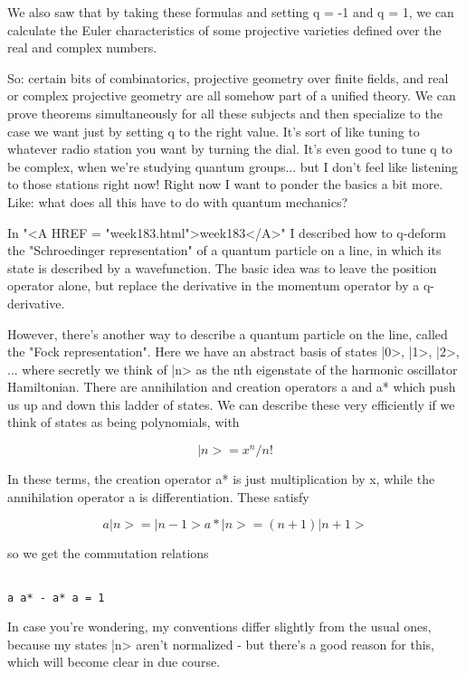 We also saw that by taking these formulas and setting q = -1 and q = 1, 
we can calculate the Euler characteristics of some projective varieties 
defined over the real and complex numbers.  

So: certain bits of combinatorics, projective geometry over finite
fields, and real or complex projective geometry are all somehow part
of a unified theory.  We can prove theorems simultaneously for all
these subjects and then specialize to the case we want just by setting
q to the right value.  It's sort of like tuning to whatever radio
station you want by turning the dial.  It's even good to tune q to 
be complex, when we're studying quantum groups... but I don't feel like
listening to those stations right now!  Right now I want to ponder 
the basics a bit more.  Like: what does all this have to do with quantum 
mechanics?

In "<A HREF = "week183.html">week183</A>" I described how to q-deform the "Schroedinger
representation" of a quantum particle on a line, in which its state is
described by a wavefunction.  The basic idea was to leave the position
operator alone, but replace the derivative in the momentum operator by
a q-derivative.

However, there's another way to describe a quantum particle on the
line, called the "Fock representation".  Here we have an abstract
basis of states |0>, |1>, |2>, ... where secretly we think of |n> as
the nth eigenstate of the harmonic oscillator Hamiltonian.  There are
annihilation and creation operators a and a* which push us up and down
this ladder of states.  We can describe these very efficiently if
we think of states as being polynomials, with


$$

|n> = x^{n} / n!
$$
    
In these terms, the creation operator a* is just multiplication by x,
while the annihilation operator a is differentiation.  These satisfy

$$

 a|n>  =        |n-1>
a*|n>  =  (n+1) |n+1>
$$
    
so we get the commutation relations

\begin{verbatim}

a a* - a* a = 1 
\end{verbatim}
    
In case you're wondering, my conventions differ slightly from the
usual ones, because my states |n> aren't normalized - but there's a
good reason for this, which will become clear in due course.  

